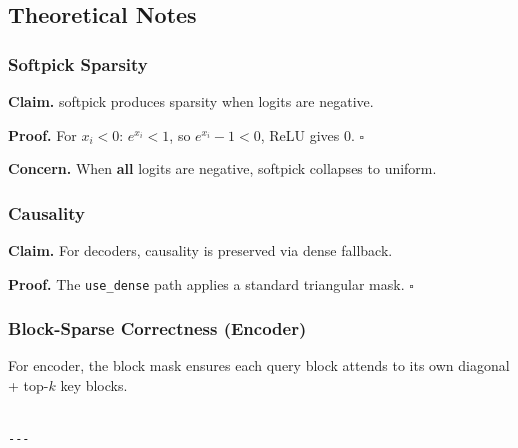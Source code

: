 \subsection{Theoretical Notes}

\subsubsection{Softpick Sparsity}

\textbf{Claim.} softpick produces sparsity when logits are negative.

\textbf{Proof.} For $x_i < 0$: $e^{x_i} < 1$, so $e^{x_i} - 1 < 0$, ReLU gives 0. $\square$

\textbf{Concern.} When \textbf{all} logits are negative, softpick collapses to uniform.

\subsubsection{Causality}

\textbf{Claim.} For decoders, causality is preserved via dense fallback.

\textbf{Proof.} The \texttt{use\_dense} path applies a standard triangular mask. $\square$

\subsubsection{Block-Sparse Correctness (Encoder)}

For encoder, the block mask ensures each query block attends to its own 
diagonal + top-$k$ key blocks.
\begin{lstlisting}

---
\end{lstlisting}